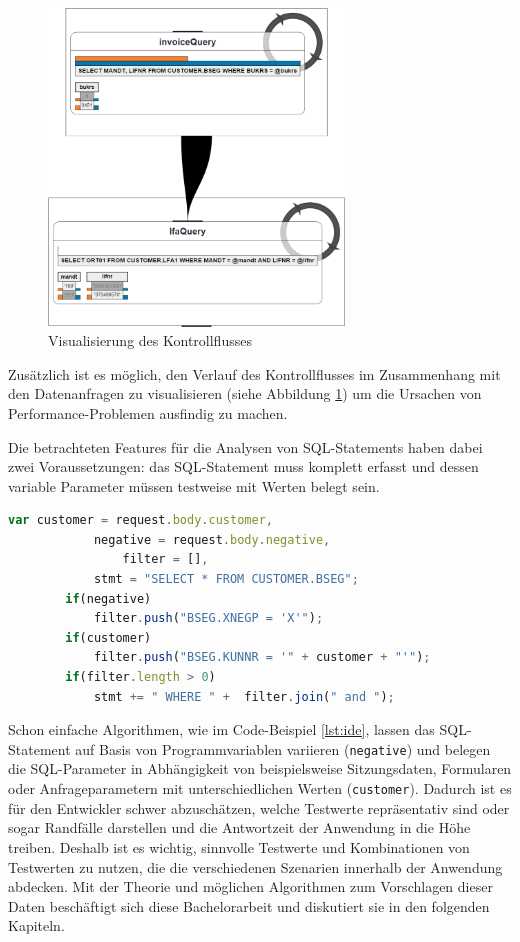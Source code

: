 \begin{figure}[ht]
	\centering
  \includegraphics[width=0.7\textwidth]{figures/feedback.png}
	\caption{Visualisierung des Kontrollflusses}
	\label{fig:feedback}
\end{figure}

Zusätzlich ist es möglich, den Verlauf des Kontrollflusses im Zusammenhang mit den Datenanfragen zu visualisieren \cite{Frahnow2014} (siehe Abbildung \ref{fig:feedback}) um die Ursachen von Performance-Problemen ausfindig zu machen.

Die betrachteten Features für die Analysen von SQL-Statements haben dabei zwei Voraussetzungen: das SQL-Statement muss komplett erfasst und dessen variable Parameter müssen testweise mit Werten belegt sein.

\begin{lstlisting}[caption={Variablen nehmen Einfluss auf die SQL-Query und -Parameter}, label={lst:ide}, language=JavaScript]
		var customer = request.body.customer,
		    negative = request.body.negative,
				filter = [],
		    stmt = "SELECT * FROM CUSTOMER.BSEG";
		if(negative)
			filter.push("BSEG.XNEGP = 'X'");
		if(customer)
			filter.push("BSEG.KUNNR = '" + customer + "'");
		if(filter.length > 0)
			stmt += " WHERE " +  filter.join(" and ");
\end{lstlisting}

Schon einfache Algorithmen, wie im Code-Beispiel \ref{lst:ide}, lassen das SQL-Statement auf Basis von Programmvariablen variieren (\texttt{negative}) und belegen die SQL-Parameter in Abhängigkeit von beispielsweise Sitzungsdaten, Formularen oder Anfrageparametern mit unterschiedlichen Werten (\texttt{customer}).
Dadurch ist es für den Entwickler schwer abzuschätzen, welche Testwerte repräsentativ sind oder sogar Randfälle darstellen und die Antwortzeit der Anwendung in die Höhe treiben.
Deshalb ist es wichtig, sinnvolle Testwerte und Kombinationen von Testwerten zu nutzen, die die verschiedenen Szenarien innerhalb der Anwendung abdecken.
Mit der Theorie und möglichen Algorithmen zum Vorschlagen dieser Daten beschäftigt sich diese Bachelorarbeit und diskutiert sie in den folgenden Kapiteln.
